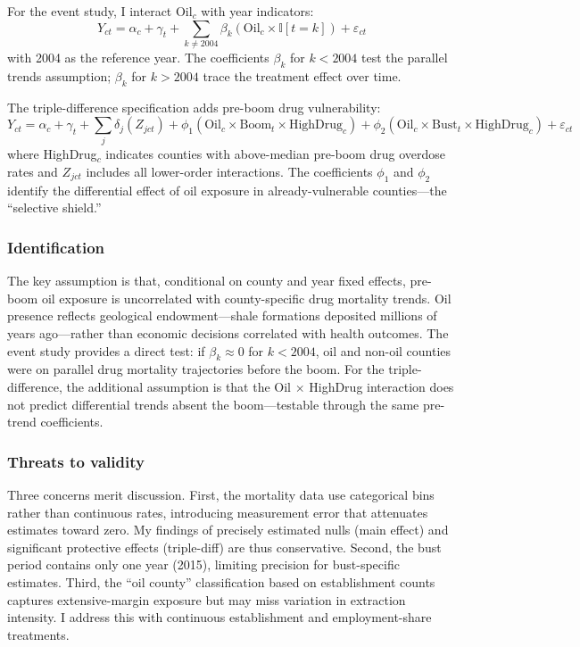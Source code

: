 \documentclass[12pt]{article}
\newcommand{\ind}{\mathbb{I}}
\begin{document}
For the event study, I interact Oil$_c$ with year indicators:
\begin{equation}
Y_{ct} = \alpha_c + \gamma_t + \sum_{k \neq 2004} \beta_k (\text{Oil}_c \times \ind[t = k]) + \varepsilon_{ct}
\label{eq:es}
\end{equation}
with 2004 as the reference year. The coefficients $\beta_k$ for $k < 2004$ test the parallel trends assumption; $\beta_k$ for $k > 2004$ trace the treatment effect over time.

The triple-difference specification adds pre-boom drug vulnerability:
\begin{equation}
Y_{ct} = \alpha_c + \gamma_t + \sum_{j} \delta_j (Z_{jct}) + \phi_1 (\text{Oil}_c \times \text{Boom}_t \times \text{HighDrug}_c) + \phi_2 (\text{Oil}_c \times \text{Bust}_t \times \text{HighDrug}_c) + \varepsilon_{ct}
\label{eq:triple}
\end{equation}
where HighDrug$_c$ indicates counties with above-median pre-boom drug overdose rates and $Z_{jct}$ includes all lower-order interactions. The coefficients $\phi_1$ and $\phi_2$ identify the differential effect of oil exposure in already-vulnerable counties---the ``selective shield.''

\subsubsection*{Identification} The key assumption is that, conditional on county and year fixed effects, pre-boom oil exposure is uncorrelated with county-specific drug mortality trends. Oil presence reflects geological endowment---shale formations deposited millions of years ago---rather than economic decisions correlated with health outcomes. The event study provides a direct test: if $\beta_k \approx 0$ for $k < 2004$, oil and non-oil counties were on parallel drug mortality trajectories before the boom. For the triple-difference, the additional assumption is that the Oil $\times$ HighDrug interaction does not predict differential trends absent the boom---testable through the same pre-trend coefficients.

\subsubsection*{Threats to validity} Three concerns merit discussion. First, the mortality data use categorical bins rather than continuous rates, introducing measurement error that attenuates estimates toward zero. My findings of precisely estimated nulls (main effect) and significant protective effects (triple-diff) are thus conservative. Second, the bust period contains only one year (2015), limiting precision for bust-specific estimates. Third, the ``oil county'' classification based on establishment counts captures extensive-margin exposure but may miss variation in extraction intensity. I address this with continuous establishment and employment-share treatments.
\end{document}
